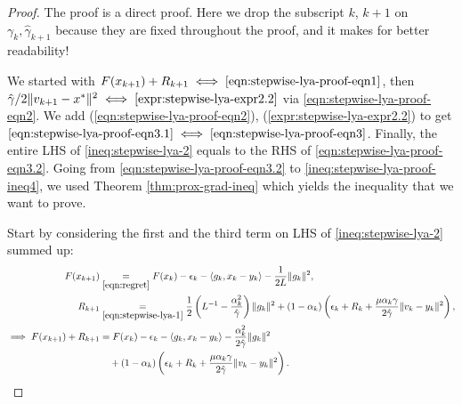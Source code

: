 \documentclass[12pt]{article}
\begin{document}
    \begin{proof}
        The proof is a direct proof. 
        Here we drop the subscript $k$, $k + 1$ on $\gamma_{k}, \hat \gamma_{k + 1}$ because they are fixed throughout the proof, and it makes for better readability! 
        \par 
        We started with $F(x_{k + 1}) + R_{k + 1} \iff \eqref{eqn:stepwise-lya-proof-eqn1}$, 
        then $\hat \gamma/2\Vert v_{k + 1} - x^*\Vert^2 \iff \eqref{expr:stepwise-lya-expr2.2}$ via \eqref{eqn:stepwise-lya-proof-eqn2}. 
        We add (\ref{eqn:stepwise-lya-proof-eqn2}), (\ref{expr:stepwise-lya-expr2.2}) to get $\eqref{eqn:stepwise-lya-proof-eqn3.1} \iff \eqref{eqn:stepwise-lya-proof-eqn3}$.
        Finally, the entire LHS of \eqref{ineq:stepwise-lya-2} equals to the RHS of \eqref{eqn:stepwise-lya-proof-eqn3.2}. 
        Going from \eqref{eqn:stepwise-lya-proof-eqn3.2} to \eqref{ineq:stepwise-lya-proof-ineq4}, we used Theorem \ref{thm:prox-grad-ineq} which yields the inequality that we want to prove. 
        \par
        Start by considering the first and the third term on LHS of \eqref{ineq:stepwise-lya-2} summed up: 
        \begin{align}\label{eqn:stepwise-lya-proof-eqn1}
            F(x_{k + 1}) &\underset{\eqref{eqn:regret}}{=}
            F(x_k) - \epsilon_k - \langle  g_k, x_k - y_k\rangle - \frac{1}{2L}\Vert g_k\Vert^2,
            \notag
            \\
            R_{k + 1}
            &\underset{\eqref{eqn:stepwise-lya-1}}{=} 
            \frac{1}{2}\left(
                L^{-1} - \frac{\alpha_k^2}{\hat \gamma}
            \right)\Vert g_k\Vert^2
            + 
            (1 - \alpha_k)
            \left(
                \epsilon_k + R_k + 
                \frac{\mu\alpha_k\gamma}{2\hat \gamma}
                \Vert v_k - y_k\Vert^2
            \right), 
            \notag
            \\
            \implies 
            F(x_{k + 1}) + R_{k + 1}
            &= 
            F(x_k) - \epsilon_k - \langle  g_k, x_k - y_k\rangle
            - \frac{\alpha_k^2}{2\hat \gamma}\Vert g_k\Vert^2
            \notag
            \\
            &\quad 
                + 
                (1 - \alpha_k)
                \left(
                    \epsilon_k + R_k + 
                    \frac{\mu\alpha_k\gamma}{2\hat \gamma}
                    \Vert v_k - y_k\Vert^2
                \right). 
        \end{align}

\end{proof}
\end{document}

